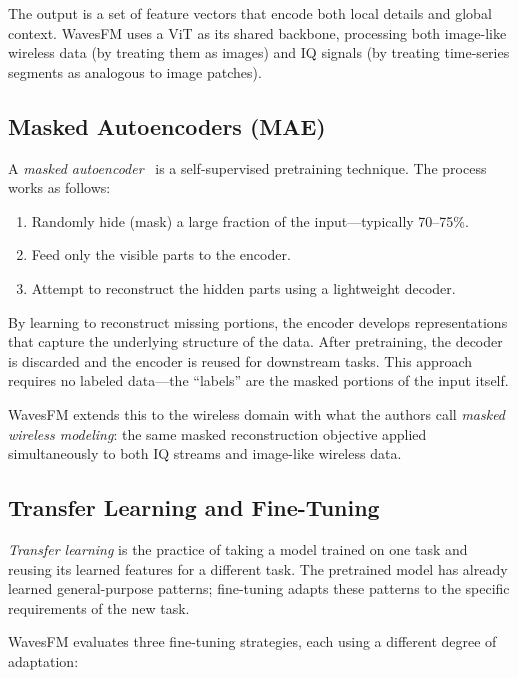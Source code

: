 \documentclass[11pt]{article}
\begin{document}
The output is a set of feature vectors that encode both local details and global context. WavesFM uses a ViT as its shared backbone, processing both image-like wireless data (by treating them as images) and IQ signals (by treating time-series segments as analogous to image patches).

\subsection{Masked Autoencoders (MAE)}

A \textit{masked autoencoder}~\cite{he2022mae} is a self-supervised pretraining technique. The process works as follows:
\begin{enumerate}
    \item Randomly hide (mask) a large fraction of the input---typically 70--75\%.
    \item Feed only the visible parts to the encoder.
    \item Attempt to reconstruct the hidden parts using a lightweight decoder.
\end{enumerate}

By learning to reconstruct missing portions, the encoder develops representations that capture the underlying structure of the data. After pretraining, the decoder is discarded and the encoder is reused for downstream tasks. This approach requires no labeled data---the ``labels'' are the masked portions of the input itself.

WavesFM extends this to the wireless domain with what the authors call \textit{masked wireless modeling}: the same masked reconstruction objective applied simultaneously to both IQ streams and image-like wireless data.

\subsection{Transfer Learning and Fine-Tuning}

\textit{Transfer learning} is the practice of taking a model trained on one task and reusing its learned features for a different task. The pretrained model has already learned general-purpose patterns; fine-tuning adapts these patterns to the specific requirements of the new task.

WavesFM evaluates three fine-tuning strategies, each using a different degree of adaptation:
\end{document}

